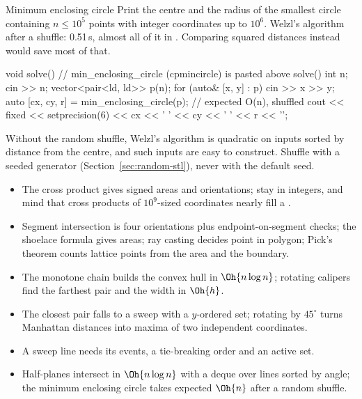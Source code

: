 
\begin{problem}{Minimum enclosing circle}
Print the centre and the radius of the smallest circle containing $n \le 10^5$ points with integer coordinates up to $10^6$.
\solution Welzl's algorithm after a shuffle: 0.51\,s, almost all of it in . Comparing squared distances instead would save most
of that.
\end{problem}

\begin{code}
void solve() {  // min_enclosing_circle (cpmincircle) is pasted above solve()
    int n;
    cin >> n;
    vector<pair<ld, ld>> p(n);
    for (auto& [x, y] : p) cin >> x >> y;
    auto [cx, cy, r] = min_enclosing_circle(p);  // expected O(n), shuffled
    cout << fixed << setprecision(6) << cx << ' ' << cy << ' ' << r << '\n';
}
\end{code}

\begin{pitfall}
Without the random shuffle, Welzl's algorithm is quadratic on inputs sorted by distance from the centre, and such inputs are easy to
construct. Shuffle with a seeded generator (Section~\ref{sec:random-stl}), never with the default seed.
\end{pitfall}

\begin{summary}
\begin{itemize}
  \item The cross product gives signed areas and orientations; stay in integers, and mind that cross products of $10^9$-sized coordinates
        nearly fill a .
  \item Segment intersection is four orientations plus endpoint-on-segment checks; the shoelace formula gives areas; ray casting decides
        point in polygon; Pick's theorem counts lattice points from the area and the boundary.
  \item The monotone chain builds the convex hull in $\Oh{n \log n}$; rotating calipers find the farthest pair and the width in $\Oh{h}$.
  \item The closest pair falls to a sweep with a $y$-ordered set; rotating by $45^\circ$ turns Manhattan distances into maxima of two
        independent coordinates.
  \item A sweep line needs its events, a tie-breaking order and an active set.
  \item Half-planes intersect in $\Oh{n \log n}$ with a deque over lines sorted by angle; the minimum enclosing circle takes expected
        $\Oh{n}$ after a random shuffle.
\end{itemize}
\end{summary}

